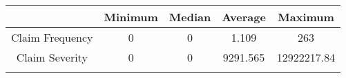 \documentclass[]{book}
\theoremstyle{definition}
\theoremstyle{definition}
\theoremstyle{definition}
\theoremstyle{remark}
\begin{document}
\begin{longtable}[]{@{}ccccc@{}}
\toprule
\begin{minipage}[b]{0.23\columnwidth}\centering\strut
~\strut
\end{minipage} & \begin{minipage}[b]{0.12\columnwidth}\centering\strut
Minimum\strut
\end{minipage} & \begin{minipage}[b]{0.14\columnwidth}\centering\strut
Median\strut
\end{minipage} & \begin{minipage}[b]{0.14\columnwidth}\centering\strut
Average\strut
\end{minipage} & \begin{minipage}[b]{0.16\columnwidth}\centering\strut
Maximum\strut
\end{minipage}\tabularnewline
\midrule
\endhead
\begin{minipage}[t]{0.23\columnwidth}\centering\strut
Claim Frequency\strut
\end{minipage} & \begin{minipage}[t]{0.12\columnwidth}\centering\strut
0\strut
\end{minipage} & \begin{minipage}[t]{0.14\columnwidth}\centering\strut
0\strut
\end{minipage} & \begin{minipage}[t]{0.14\columnwidth}\centering\strut
1.109\strut
\end{minipage} & \begin{minipage}[t]{0.16\columnwidth}\centering\strut
263\strut
\end{minipage}\tabularnewline
\begin{minipage}[t]{0.23\columnwidth}\centering\strut
Claim Severity\strut
\end{minipage} & \begin{minipage}[t]{0.12\columnwidth}\centering\strut
0\strut
\end{minipage} & \begin{minipage}[t]{0.14\columnwidth}\centering\strut
0\strut
\end{minipage} & \begin{minipage}[t]{0.14\columnwidth}\centering\strut
9291.565\strut
\end{minipage} & \begin{minipage}[t]{0.16\columnwidth}\centering\strut
12922217.84\strut
\end{minipage}\tabularnewline
\begin{minipage}[t]{0.23\columnwidth}\centering\strut

\end{minipage}
\end{longtable}
\end{document}
